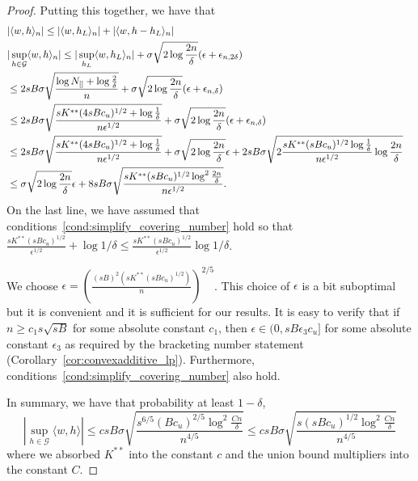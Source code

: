 \begin{proof}
Putting this together, we have that
\begin{align*}
\lefteqn{|\langle w, h \rangle_n | \leq | \langle w, h_L\rangle_n| + |\langle w, h - h_L\rangle_n|}\\
\lefteqn{|\sup_{h \in \mathcal{G}} \langle w, h \rangle_n| \leq 
     | \sup_{h_L} \langle w, h_L \rangle_n | + \sigma \sqrt{2 \log \frac{2n}{\delta}} (\epsilon + \epsilon_{n, 2\delta})} \\
   &\leq   2 sB \sigma \sqrt{ \frac{ \log N_{[]} + \log \frac{2}{\delta}}{n}} + \sigma \sqrt{2 \log \frac{2n}{\delta}} (\epsilon + \epsilon_{n, \delta}) \\
   &\leq  2 sB \sigma \sqrt{ \frac{sK^{**} (4sBc_u)^{1/2} + \log \frac{1}{\delta}}{n \epsilon^{1/2}}} +
   \sigma \sqrt{ 2\log \frac{2n}{\delta}} (\epsilon + \epsilon_{n, \delta}) \\
   &\leq 2 sB \sigma \sqrt{ \frac{sK^{**} (4sBc_u)^{1/2} + \log \frac{1}{\delta}}{n \epsilon^{1/2}}} +
   \sigma\sqrt{2 \log \frac{2n}{\delta}} \epsilon + 2sB \sigma \sqrt{2 \frac{sK^{**} (sBc_u)^{1/2}\log \frac{1}{\delta}}{n \epsilon^{1/2}} \log \frac{2n}{\delta}} \\
   &\leq \sigma\sqrt{2\log \frac{2n}{\delta}} \epsilon + 8 sB \sigma \sqrt{ \frac{sK^{**} (sBc_u)^{1/2} \log^2 \frac{2n}{\delta}}{n \epsilon^{1/2}}}.
\end{align*}
On the last line, we have assumed that conditions~\ref{cond:simplify_covering_number} hold so that $ \frac{sK^{**}(sBc_u)^{1/2}}{\epsilon^{1/2}} + \log 1/\delta \leq \frac{sK^{**} (sBc_u)^{1/2}}{\epsilon^{1/2}} \log 1/\delta$.

We choose $\epsilon = \left( \frac{(sB)^2 (s
    K^{**} (sBc_u)^{1/2})}{n} \right)^{2/5}$. This choice of $\epsilon$ is a bit suboptimal but it is convenient and it is sufficient for our results. It is easy to verify that
if $n \geq c_1 s \sqrt{sB}$ for some absolute constant $c_1$, then 
$\epsilon \in (0, sB \epsilon_3c_u]$ for some absolute constant $\epsilon_3$ as required by the bracketing number statement (Corollary~\ref{cor:convexadditive_lp}). Furthermore, conditions~\eqref{cond:simplify_covering_number} also hold. 


In summary, we have that probability at least $1-\delta$,
\[
|\sup_{h \in \mathcal{G}} \langle w, h \rangle | \leq c sB \sigma \sqrt{ 
   \frac{s^{6/5} (Bc_u)^{2/5} \log^2 \frac{Cn}{\delta}}{n^{4/5}}} \leq 
  c sB \sigma \sqrt{ 
   \frac{s (sBc_u)^{1/2} \log^2 \frac{Cn}{\delta}}{n^{4/5}}}
\]
where we absorbed $K^{**}$ into the constant $c$ and the union bound multipliers into the constant $C$.


\end{proof}
